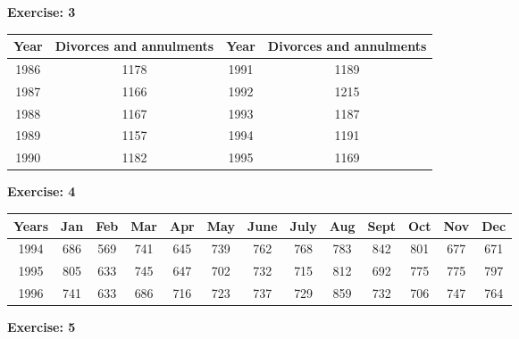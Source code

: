 \documentclass[12pt, english]{article}
\numberwithin{equation}{section} %
\theoremstyle{plain}
\theoremstyle{definition}
\begin{document}
\newpage
\begin{center}
	\huge{\textbf{Exercise: 3}}
\end{center}

\begin{center}
	\begin{tabular}{||c|c|c|c||}
		\hline\hline
		Year & Divorces and annulments & Year & Divorces and annulments \\
		\hline\hline
		1986 & 1178 & 1991 & 1189 \\
		1987 & 1166 & 1992 & 1215 \\
		1988 & 1167 & 1993 & 1187 \\
		1989 & 1157 & 1994 & 1191 \\
		1990 & 1182 & 1995 & 1169 \\
		\hline\hline
	\end{tabular}
\end{center}

\newpage
\begin{center}
	\huge{\textbf{Exercise: 4}}
\end{center}

\begin{center}
	\begin{tabular}{||c|c|c|c|c|c|c|c|c|c|c|c|c||}
		\hline\hline
		Years & Jan & Feb & Mar & Apr & May & June & July & Aug & Sept & Oct & Nov & Dec \\
		\hline\hline
		1994 & 686 & 569 & 741 & 645 & 739 & 762 & 768 & 783 & 842 & 801 & 677 & 671 \\
		1995 & 805 & 633 & 745 & 647 & 702 & 732 & 715 & 812 & 692 & 775 & 775 & 797 \\
		1996 & 741 & 633 & 686 & 716 & 723 & 737 & 729 & 859 & 732 & 706 & 747 & 764 \\
		\hline\hline
	\end{tabular}
\end{center}

\newpage
\begin{center}
	\huge{\textbf{Exercise: 5}}
\end{center}
\end{document}
